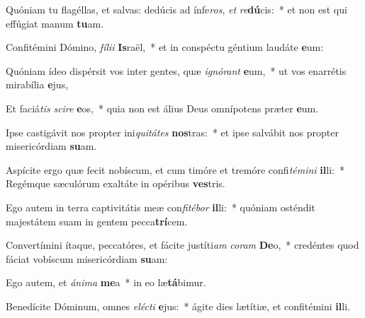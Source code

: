 \item Quóniam tu flagéllas, et salvas: dedúcis ad ínfe\textit{ros}, \textit{et} \textit{re}\textbf{dú}cis:~* et non est qui effúgiat manum \textbf{tu}am.
\item Confitémini Dómino, \textit{fí}\textit{li}\textit{i} \textbf{Is}raël,~* et in conspéctu géntium laudáte \textbf{e}um:
\item Quóniam ídeo dispérsit vos inter gentes, quæ \textit{i}\textit{gnó}\textit{rant} \textbf{e}um,~* ut vos enarrétis mirabília \textbf{e}jus,
\item Et faciá\textit{tis} \textit{sci}\textit{re} \textbf{e}os,~* quia non est álius Deus omnípotens præter \textbf{e}um.
\item Ipse castigávit nos propter ini\textit{qui}\textit{tá}\textit{tes} \textbf{nos}tras:~* et ipse salvábit nos propter misericórdiam \textbf{su}am.
\item Aspícite ergo quæ fecit nobíscum, et cum timóre et tremóre confi\textit{té}\textit{mi}\textit{ni} \textbf{il}li:~* Regémque sæculórum exaltáte in opéribus \textbf{ves}tris.
\item Ego autem in terra captivitátis meæ con\textit{fi}\textit{té}\textit{bor} \textbf{il}li:~* quóniam osténdit majestátem suam in gentem pecca\textbf{trí}cem.
\item Convertímini ítaque, peccatóres, et fácite justíti\textit{am} \textit{co}\textit{ram} \textbf{De}o,~* credéntes quod fáciat vobíscum misericórdiam \textbf{su}am:
\item Ego autem, et \textit{á}\textit{ni}\textit{ma} \textbf{me}a~* in eo læ\textbf{tá}bimur.
\item Benedícite Dóminum, omnes \textit{e}\textit{léc}\textit{ti} \textbf{e}jus:~* ágite dies lætítiæ, et confitémini \textbf{il}li.
